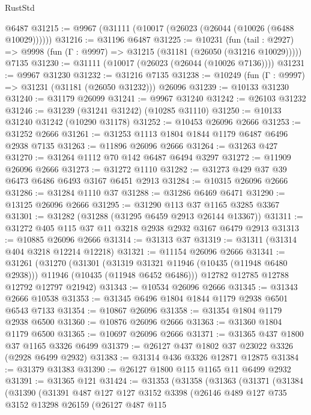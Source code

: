 \begin{lexlean}{RustStd}
\begin{coremodule}
    @6487
@31215 := @9967 (@31111 (@10017 (@26023 (@26044 (@10026 (@6488 @10029))))))
@31216 := @31196 @6487
@31225 := @10231
    (fun (tail : @2927) => @9998 (fun (Γ : @9997) => @31215 (@31181 (@26050 (@31216 @10029)))))
    @7135
@31230 := @31111 (@10017 (@26023 (@26044 (@10026 @7136))))
@31231 := @9967 @31230
@31232 := @31216 @7135
@31238 := @10249 (fun (Γ : @9997) => @31231 (@31181 (@26050 @31232))) @26096
@31239 := @10133 @31230
@31240 := @31179 @26099
@31241 := @9967 @31240
@31242 := @26103 @31232
@31246 := @31239 (@31241 @31242) (@10285 @31110)
@31250 := @10133 @31240 @31242 (@10290 @31178)
@31252 := @10453 @26096 @2666
@31253 := @31252 @2666
@31261 := @31253 @1113 @1804 @1844 @1179 @6487 @6496 @2938 @7135
@31263 := @11896 @26096 @2666
@31264 := @31263 @427
@31270 := @31264 @1112 @70 @142 @6487 @6494 @3297
@31272 := @11909 @26096 @2666
@31273 := @31272 @1110
@31282 := @31273 @429 @37 @39 @6473 @6486 @6493 @3167 @6451 @2913
@31284 := @10315 @26096 @2666
@31286 := @31284 @1110 @37
@31288 := @31286 @6469 @6471
@31290 := @13125 @26096 @2666
@31295 := @31290 @113 @37 @1165 @3285 @3367
@31301 := @31282 (@31288 (@31295 @6459 @2913 @26144 @13367))
@31311 := @31272 @405 @115 @37 @11 @3218 @2938 @2932 @3167 @6479 @2913
@31313 := @10885 @26096 @2666
@31314 := @31313 @37
@31319 := @31311 (@31314 @404 @3218 @12214 @12218)
@31321 := @11154 @26096 @2666
@31341 := @31261
    (@31270
      (@31301
        (@31319 @31321 @11946 (@10435 (@11948 @6480 @2938)))
        @11946
        (@10435 (@11948 @6452 @6486)))
      @12782
      @12785
      @12788
      @12792
      @12797
      @21942)
@31343 := @10534 @26096 @2666
@31345 := @31343 @2666 @10538
@31353 := @31345 @6496 @1804 @1844 @1179 @2938 @6501 @6543 @7133
@31354 := @10867 @26096
@31358 := @31354 @1804 @1179 @2938 @6500
@31360 := @10876 @26096 @2666
@31363 := @31360 @1804 @1179 @6500
@31365 := @10697 @26096 @2666
@31371 := @31365 @437 @1800 @37 @1165 @3326 @6499
@31379 := @26127 @437 @1802 @37 @23022 @3326 (@2928 @6499 @2932)
@31383 := @31314 @436 @3326 @12871 @12875
@31384 := @31379 @31383
@31390 := @26127 @1800 @115 @1165 @11 @6499 @2932
@31391 := @31365 @121
@31424 := @31353
    (@31358
      (@31363
        (@31371
          (@31384
            (@31390
              (@31391
                @487
                @127
                @127
                @3152
                @3398
                (@26146
                  @489
                  @127
                  @735
                  @3152
                  @13298
                  @26159
                  (@26127
                    @487
                    @115

\end{coremodule}
\end{lexlean}
